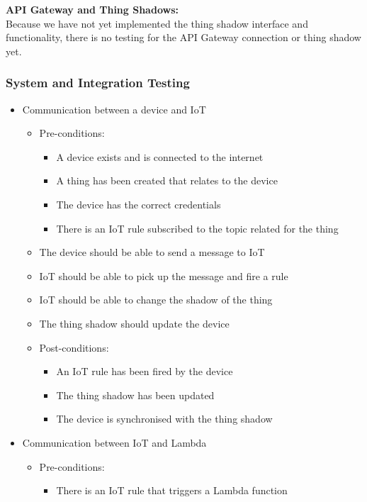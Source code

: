 \documentclass{article}
\begin{document}
				\textbf{API Gateway and Thing Shadows:}
				\\
				Because we have not yet implemented the thing shadow interface and functionality, there is no testing for the API Gateway connection or thing shadow yet.
				
				\subsubsection{System and Integration Testing}
				\begin{itemize}
					\item{Communication between a device and IoT}
						\begin{itemize}
							\item Pre-conditions: 
							\begin{itemize}
								\item A device exists and is connected to the internet
								\item A thing has been created that relates to the device
								\item The device has the correct credentials
								\item There is an IoT rule subscribed to the topic related for the thing
							\end{itemize}
							\item The device should be able to send a message to IoT
							\item IoT should be able to pick up the message and fire a rule
							\item IoT should be able to change the shadow of the thing
							\item The thing shadow should update the device
							\item Post-conditions:
							\begin{itemize}
								\item An IoT rule has been fired by the device
								\item The thing shadow has been updated
								\item The device is synchronised with the thing shadow
							\end{itemize}
						\end{itemize}
					\item{Communication between IoT and Lambda}
					\begin{itemize}
						\item Pre-conditions: 
						\begin{itemize}
							\item There is an IoT rule that triggers a Lambda function

\end{itemize}
\end{itemize}
\end{itemize}
\end{document}
